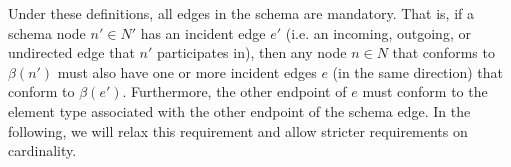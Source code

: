 \documentclass[a4paper]{article}
\begin{document}
Under these definitions, all edges in the schema are mandatory. That is, if a schema node $n' \in N'$ has an incident edge $e'$ (i.e. an incoming, outgoing, or undirected edge that $n'$ participates in), then any node $n \in N$ that conforms to $\beta(n')$ must also have one or more incident edges $e$ (in the same direction) that conform to $\beta(e')$. Furthermore, the other endpoint of $e$ must conform to the element type associated with the other endpoint of the schema edge. In the following, we will relax this requirement and allow stricter requirements on cardinality.

\end{document}
